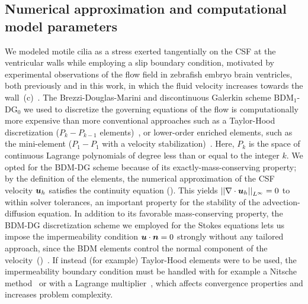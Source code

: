 \documentclass{WileyMSP-template}
\begin{document}
\subsection{Numerical approximation and computational model parameters}
We modeled motile cilia as a stress
exerted tangentially on the CSF at the ventricular walls
while employing a slip boundary condition,
motivated by experimental observations of the
flow field in zebrafish embryo brain ventricles, both previously and in this work, in which
the fluid velocity increases towards the
wall~(c)~\cite{Olstad2019CiliaryDevelopment}. 
The Brezzi-Douglas-Marini and discontinuous Galerkin scheme
$\mathrm{BDM}_1$-$\mathrm{DG}_0$
we used to discretize the governing equations of the flow
is computationally more expensive
than more conventional approaches such as a
Taylor-Hood discretization
($P_k-P_{k-1}$ elements)~\cite{Stenberg1990ErrorProblem}, or lower-order enriched
elements, such as the mini-element
($P_1-P_1$ with a velocity stabilization)~\cite{Brezzi2011MixedMethods}.
Here, $P_k$ is the space of continuous Lagrange polynomials of degree less
than or equal to the integer $k$.
We opted for the BDM-DG scheme because of its exactly-mass-conserving property;
by the definition of the elements, the numerical approximation of
the CSF velocity $\bm{u}_h$ satisfies the continuity equation ().
This yields ${\vert\vert\nabla\cdot\bm{u}_h\vert\vert}_{L^{\infty}}=0$ to within solver tolerances,
an important property for the stability of the advection-diffusion
equation\cite{cesmelioglu2022compatible, johnson2009numerical, gresho1998incompressible}.
In addition to its favorable mass-conserving property,
the BDM-DG discretization scheme 
we employed for the Stokes equations
lets us impose the impermeability condition $\bm{u}\cdot\bm{n}=0$
strongly without any tailored approach,
since the BDM elements control the normal component of the 
velocity~()~\cite{Brezzi1985TwoProblems}.
If instead (for example) Taylor-Hood
elements were to be used, the impermeability boundary condition must
be handled with for example a Nitsche method~\cite{Nitsche1971UberSind}
or with a Lagrange multiplier~\cite{Babuska1973TheMultipliers,
Bertoluzza2017BoundaryHemodynamics}, which affects
convergence properties and increases problem complexity.
\end{document}
